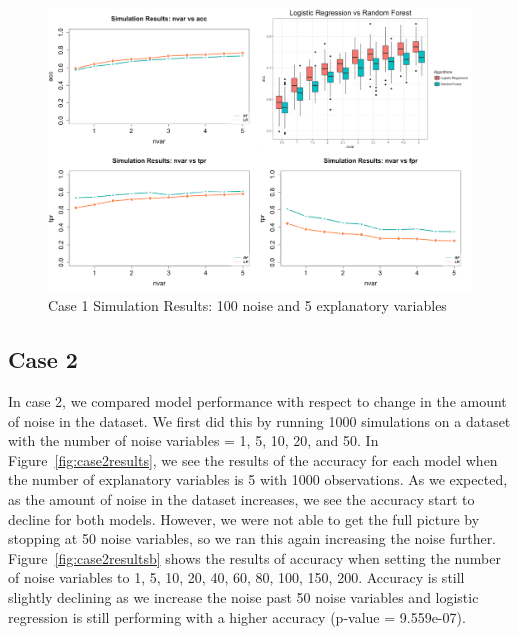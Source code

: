 \documentclass{llncs}
\begin{document}
\begin{figure}
\centering
\includegraphics[scale=0.55]{case1_b.png}
\caption{Case 1 Simulation Results: 100 noise and 5 explanatory variables}
\label{fig:case1resultsb}
\end{figure}

\subsection{Case 2}

In case 2, we compared model performance with respect to change in the amount of noise in the dataset. We first did this by running 1000 simulations on a dataset with the number of noise variables = 1, 5, 10, 20, and 50.  In Figure~\ref{fig:case2results}, we see the results of the accuracy for each model when the number of explanatory variables is 5 with 1000 observations.  As we expected, as the amount of noise in the dataset increases, we see the accuracy start to decline for both models. However, we were not able to get the full picture by stopping at 50 noise variables, so we ran this again increasing the noise further.  Figure~\ref{fig:case2resultsb} shows the results of accuracy when setting the number of noise variables to 1, 5, 10, 20, 40, 60, 80, 100, 150, 200.  Accuracy is still slightly declining as we increase the noise past 50 noise variables and logistic regression is still performing with a higher accuracy (p-value = 9.559e-07).
\end{document}
